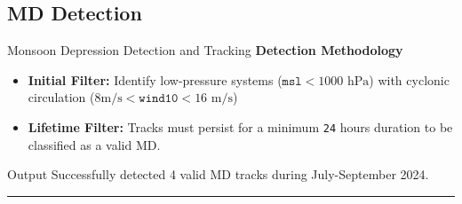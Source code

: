 \documentclass[aspectratio=169,t,xcolor=table]{beamer}
\begin{document}
\subsection{MD Detection}
\begin{frame}{Monsoon Depression Detection and Tracking}
	\textbf{\small Detection Methodology}
	\footnotesize
	\begin{itemize}
		\item \textbf{Initial Filter:} Identify low-pressure systems ($\texttt{msl} < 1000 \text{ hPa}$) with cyclonic circulation ($8 \text{m/s} < \texttt{wind10} < 16 \text{ m/s}$)\footnotemark
		\item \textbf{Lifetime Filter:} Tracks must persist for a minimum \texttt{24} hours duration  to be classified as a valid MD.
	\end{itemize}

	\vspace{1.5cm}

	\begin{alertblock}{\small Output}
		\footnotesize
		Successfully detected 4 valid MD tracks during July-September 2024.
	\end{alertblock}

	\vspace{1cm}

	\hrule
\end{frame}
\end{document}
